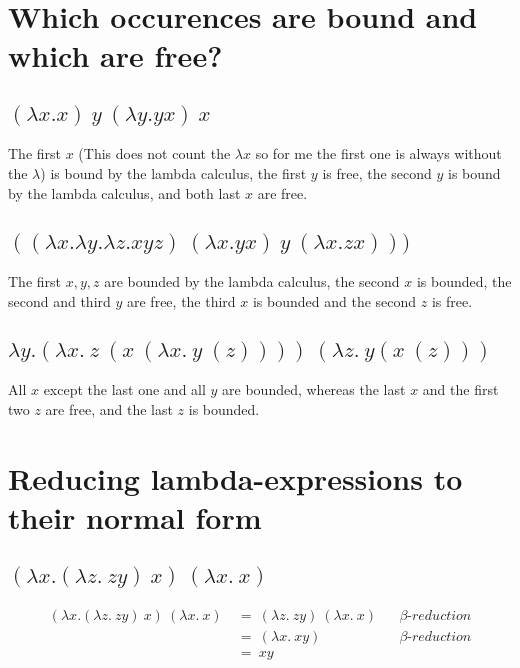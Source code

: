 \documentclass{report}
\begin{document}
	\section{Which occurences are bound and which are free?}
	\startsection
		\subsection{$(\lambda x.x) \ y \ (\lambda y.yx ) \ x$}
		\startsection
			The first $x$ (This does not count the $\lambda x$ so for me the first one is always without the $\lambda$) is bound by the lambda calculus, the first $y$ is free, the second $y$ is bound by the lambda calculus, and both last $x$ are free.
		\closesection
		\subsection{$((\lambda x . \lambda y . \lambda z.xyz) \ (\lambda x.yx) \ y \ (\lambda x.zx)))$}
		\startsection
			The first $x,y,z$ are bounded by the lambda calculus, the second $x$ is bounded, the second and third $y$ are free, the third $x$ is bounded and the second $z$ is free.
		\closesection
		\subsection{$\lambda y.(\lambda x . \ z \ (x \ (\lambda x . \ y \ (z)))) \ (\lambda z. \ y (x \ (z)))$}
		\startsection
			All $x$ except the last one and all $y$ are bounded, whereas the last $x$ and the first two $z$ are free, and the last $z$ is bounded.
		\closesection
	\closesection
	
	\section{Reducing lambda-expressions to their normal form}
	\startsection
		\subsection{$(\lambda x . (\lambda z. \ zy) \ x) \ (\lambda x. \ x)$}
		\startsection
			\begin{align*}
				(\lambda x . (\lambda z. \ zy) \ x) \ (\lambda x. \ x) \ & = \ (\lambda z. \ zy) \ (\lambda x. \ x) && \beta \textit{-reduction} \\
				& = \ (\lambda x . \ xy) && \beta \textit{-reduction} \\
				& = \ xy
			\end{align*}
		\closesection
\end{document}

